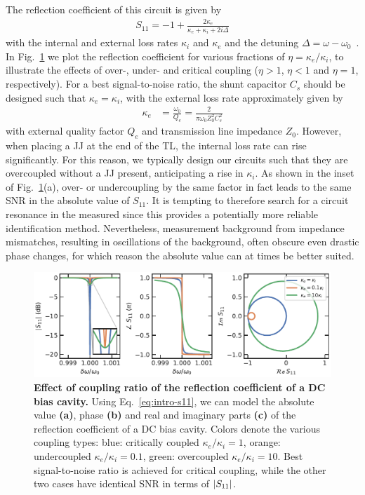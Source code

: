The reflection coefficient of this circuit is given by
%
\begin{align}
S_{11}=-1+\frac{2\kappa_e}{\kappa_e+\kappa_i+2i\Delta}
\label{eq:intro-s11}
\end{align}
%
with the internal and external loss rates $\kappa_i$ and $\kappa_e$ and the detuning $\Delta=\omega-\omega_0$~\cite{bosmanBroadbandArchitectureGalvanically2015c}.
%
In Fig.~\ref{fig:s11} we plot the reflection coefficient for various fractions of $\eta=\kappa_e/\kappa_i$, to illustrate the effects of over-, under- and critical coupling ($\eta>1$, $\eta<1$ and $\eta=1$, respectively).
%
For a best signal-to-noise ratio, the shunt capacitor $C_s$ should be designed such that $\kappa_e=\kappa_i$, with the external loss rate approximately given by
%
\begin{align}
\kappa_e &= \frac{\omega_0}{Q_e} = \frac{2}{\pi\omega_0Z_0^2C_s^2}
\label{eq:intro-kappae}
\end{align}
%
with external quality factor $Q_e$ and transmission line impedance $Z_0$.
%
However, when placing a JJ at the end of the TL, the internal loss rate can rise significantly.
%
For this reason, we typically design our circuits such that they are overcoupled without a JJ present, anticipating a rise in $\kappa_i$.
%
As shown in the inset of Fig.~\ref{fig:s11}(a), over- or undercoupling by the same factor in fact leads to the same SNR in the absolute value of $S_{11}$.
%
It is tempting to therefore search for a circuit resonance in the measured since this provides a potentially more reliable identification method.
%
Nevertheless, measurement background from impedance mismatches, resulting in oscillations of the background, often obscure even drastic phase changes, for which reason the absolute value can at times be better suited.

\begin{figure}[t]
	\centering
	\includegraphics[width=\linewidth]{chapter-introduction/figs/model_DC_bias_cavity_coupling.pdf}
	\caption{
		\textbf{Effect of coupling ratio of the reflection coefficient of a DC bias cavity.}
		Using Eq.~\ref{eq:intro-s11}, we can model the absolute value \textbf{(a)}, phase \textbf{(b)} and real and imaginary parts \textbf{(c)} of the reflection coefficient of a DC bias cavity.
		Colors denote the various coupling types: blue: critically coupled $\kappa_e/\kappa_i=1$, orange: undercoupled $\kappa_e/\kappa_i=0.1$, green: overcoupled $\kappa_e/\kappa_i=10$.
		Best signal-to-noise ratio is achieved for critical coupling, while the other two cases have identical SNR in terms of $\lvert S_{11}\rvert$.
	}
	\label{fig:s11}
\end{figure}

